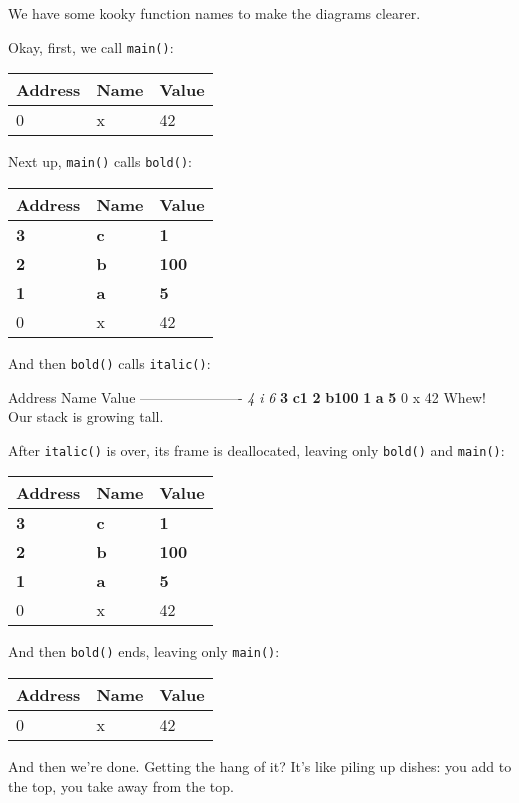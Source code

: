 \documentclass[a4paper,]{book}
\begin{document}
We have some kooky function names to make the diagrams clearer.

Okay, first, we call \texttt{main()}:

\begin{longtable}[c]{@{}lll@{}}
\toprule
Address & Name & Value\tabularnewline
\midrule
\endhead
0 & x & 42\tabularnewline
\bottomrule
\end{longtable}

Next up, \texttt{main()} calls \texttt{bold()}:

\begin{longtable}[c]{@{}lll@{}}
\toprule
Address & Name & Value\tabularnewline
\midrule
\endhead
\textbf{3} & \textbf{c} & \textbf{1}\tabularnewline
\textbf{2} & \textbf{b} & \textbf{100}\tabularnewline
\textbf{1} & \textbf{a} & \textbf{5}\tabularnewline
0 & x & 42\tabularnewline
\bottomrule
\end{longtable}

And then \texttt{bold()} calls \texttt{italic()}:

\textbar{} Address \textbar{} Name \textbar{} Value \textbar{}
\textbar{}---------\textbar{}------\textbar{}-------\textbar{}
\textbar{} \emph{4} \textbar{} \emph{i} \textbar{} \emph{6} \textbar{}
\textbar{} \textbf{3} \textbar{} \textbf{c}\textbar{}\textbf{1}
\textbar{} \textbar{} \textbf{2} \textbar{}
\textbf{b}\textbar{}\textbf{100}\textbar{} \textbar{} \textbf{1}
\textbar{} \textbf{a}\textbar{} \textbf{5} \textbar{} \textbar{} 0
\textbar{} x \textbar{} 42 \textbar{} Whew! Our stack is growing tall.

After \texttt{italic()} is over, its frame is deallocated, leaving only
\texttt{bold()} and \texttt{main()}:

\begin{longtable}[c]{@{}lll@{}}
\toprule
Address & Name & Value\tabularnewline
\midrule
\endhead
\textbf{3} & \textbf{c} & \textbf{1}\tabularnewline
\textbf{2} & \textbf{b} & \textbf{100}\tabularnewline
\textbf{1} & \textbf{a} & \textbf{5}\tabularnewline
0 & x & 42\tabularnewline
\bottomrule
\end{longtable}

And then \texttt{bold()} ends, leaving only \texttt{main()}:

\begin{longtable}[c]{@{}lll@{}}
\toprule
Address & Name & Value\tabularnewline
\midrule
\endhead
0 & x & 42\tabularnewline
\bottomrule
\end{longtable}

And then we're done. Getting the hang of it? It's like piling up dishes:
you add to the top, you take away from the top.
\end{document}
